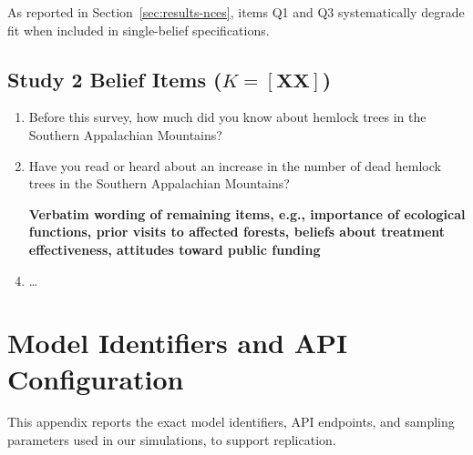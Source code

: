 \documentclass[12pt]{article}
\begin{document}
\noindent As reported in Section~\ref{sec:results-nces}, items Q1 and Q3 systematically degrade fit when included in single-belief specifications. 

\subsection{Study 2 Belief Items ($K = [\textbf{XX}]$)}

\begin{enumerate}[label=Q\arabic*., leftmargin=*]
    \item Before this survey, how much did you know about hemlock trees in the Southern Appalachian Mountains?
    \item Have you read or heard about an increase in the number of dead hemlock trees in the Southern Appalachian Mountains?
    \item [\textbf{Verbatim wording of remaining items, e.g., importance of ecological functions, prior visits to affected forests, beliefs about treatment effectiveness, attitudes toward public funding}]
    \item \dots
\end{enumerate}

\section{Model Identifiers and API Configuration}\label{app:model-ids}

This appendix reports the exact model identifiers, API endpoints, and sampling parameters used in our simulations, to support replication.
\end{document}
